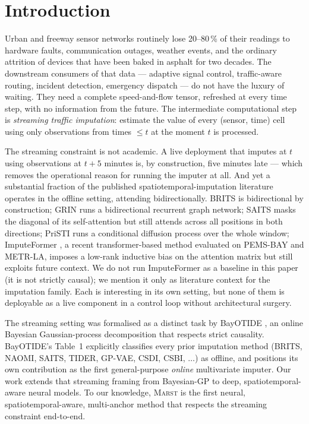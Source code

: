 \documentclass[11pt]{article}
\newcommand{\MARST}{\textsc{Marst}\xspace}
\begin{document}
\section{Introduction}
\label{sec:intro}

Urban and freeway sensor networks routinely lose 20--80\,\% of their
readings to hardware faults, communication outages, weather events, and
the ordinary attrition of devices that have been baked in asphalt for
two decades.  The downstream consumers of that data --- adaptive signal
control, traffic-aware routing, incident detection, emergency dispatch
--- do not have the luxury of waiting.  They need a complete
speed-and-flow tensor, refreshed at every time step, with no
information from the future.  The intermediate computational step is
\emph{streaming traffic imputation}: estimate the value of every
(sensor, time) cell using only observations from times $\leq t$ at the
moment $t$ is processed.

The streaming constraint is not academic.  A live deployment that
imputes at $t$ using observations at $t+5$ minutes is, by construction,
five minutes late --- which removes the operational reason for running
the imputer at all.  And yet a substantial fraction of the published
spatiotemporal-imputation literature operates in the offline setting,
attending bidirectionally.  BRITS \citep{cao2018brits} is bidirectional
by construction; GRIN \citep{cini2022grin} runs a bidirectional
recurrent graph network; SAITS \citep{du2023saits} masks the diagonal
of its self-attention but still attends across all positions in both
directions; PriSTI \citep{liu2023pristi} runs a conditional diffusion
process over the whole window; ImputeFormer \citep{nie2024imputeformer},
a recent transformer-based method evaluated on PEMS-BAY and METR-LA,
imposes a low-rank inductive bias on the attention matrix but still
exploits future context.  We do not run ImputeFormer as a baseline in
this paper (it is not strictly causal); we mention it only as
literature context for the imputation family.  Each is interesting in its own setting, but
none of them is deployable as a live component in a control loop
without architectural surgery.

The streaming setting was formalised as a distinct task by BayOTIDE
\citep{fang2024bayotide}, an online Bayesian Gaussian-process
decomposition that respects strict causality.  BayOTIDE's Table~1
explicitly classifies every prior imputation method (BRITS, NAOMI,
SAITS, TIDER, GP-VAE, CSDI, CSBI, $\ldots$) as offline, and positions
its own contribution as the first general-purpose \emph{online}
multivariate imputer.  Our work extends that streaming framing from
Bayesian-GP to deep, spatiotemporal-aware neural models.  To our
knowledge, \MARST is the first neural, spatiotemporal-aware,
multi-anchor method that respects the streaming constraint
end-to-end.
\end{document}
